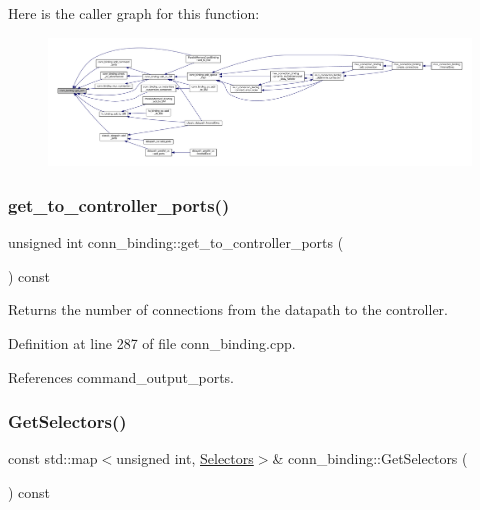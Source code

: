 Here is the caller graph for this function\+:
\nopagebreak
\begin{figure}[H]
\begin{center}
\leavevmode
\includegraphics[width=350pt]{d2/db1/classconn__binding_a0a23777374b0ac3c3c9811bbeb2c3137_icgraph}
\end{center}
\end{figure}
\mbox{\label{classconn__binding_a61f18502e0796a50790c50cf2ed77e9f}} 
\subsubsection{\texorpdfstring{get\+\_\+to\+\_\+controller\+\_\+ports()}{get\_to\_controller\_ports()}}
{\footnotesize\ttfamily unsigned int conn\+\_\+binding\+::get\+\_\+to\+\_\+controller\+\_\+ports (\begin{DoxyParamCaption}{ }\end{DoxyParamCaption}) const}



Returns the number of connections from the datapath to the controller. 



Definition at line 287 of file conn\+\_\+binding.\+cpp.



References command\+\_\+output\+\_\+ports.

\mbox{\label{classconn__binding_acc27af44bcec7ebad475db78c098ce59}} 
\subsubsection{\texorpdfstring{Get\+Selectors()}{GetSelectors()}}
{\footnotesize\ttfamily const std\+::map$<$unsigned int, \hyperlink{classconn__binding_a1994d72baf506bcb1d94e0cfede4258b}{Selectors}$>$\& conn\+\_\+binding\+::\+Get\+Selectors (\begin{DoxyParamCaption}{ }\end{DoxyParamCaption}) const\hspace{0.3cm}{\ttfamily [inline]}}



